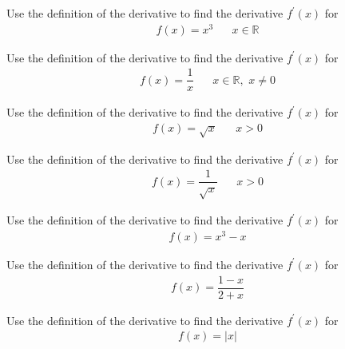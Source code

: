 \begin{exercise}
Use the definition of the derivative to find the derivative $f^{'}(x)$ for
\begin{align*}
    f(x) = x^{3} \hspace{20pt} x \in \mathbb{R}
\end{align*}
\end{exercise}

\begin{exercise}
Use the definition of the derivative to find the derivative $f^{'}(x)$ for
\begin{align*}
    f(x) = \dfrac{1}{x} \hspace{20pt} x \in \mathbb{R}, \hspace{4pt} x \neq 0
\end{align*}
\end{exercise}

\begin{exercise}
Use the definition of the derivative to find the derivative $f^{'}(x)$ for
\begin{align*}
    f(x) = \sqrt{x} \hspace{20pt} x > 0
\end{align*}
\end{exercise}

\begin{exercise}
Use the definition of the derivative to find the derivative $f^{'}(x)$ for
\begin{align*}
    f(x) = \dfrac{1}{\sqrt{x}} \hspace{20pt} x > 0
\end{align*}
\end{exercise}

\begin{exercise}
Use the definition of the derivative to find the derivative $f^{'}(x)$ for
\begin{align*}
    f(x) = x^{3} - x
\end{align*}
\end{exercise}

\begin{exercise}
Use the definition of the derivative to find the derivative $f^{'}(x)$ for
\begin{align*}
    f(x) = \dfrac{1-x}{2+x}
\end{align*}
\end{exercise}

\begin{exercise}
Use the definition of the derivative to find the derivative $f^{'}(x)$ for
\begin{align*}
    f(x) = \lvert x \rvert
\end{align*}
\end{exercise}

